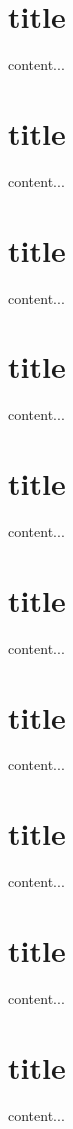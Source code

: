 \documentclass{beamer}
\begin{document}
\section{title}
\begin{frame}
content...
\end{frame}

\section{title}
\begin{frame}
content...
\end{frame}

\section{title}
\begin{frame}
content...
\end{frame}

\section{title}
\begin{frame}
content...
\end{frame}

\section{title}
\begin{frame}
content...
\end{frame}

\section{title}
\begin{frame}
content...
\end{frame}

\section{title}
\begin{frame}
content...
\end{frame}

\section{title}
\begin{frame}
content...
\end{frame}

\section{title}
\begin{frame}
content...
\end{frame}

\section{title}
\begin{frame}
content...
\end{frame}
\end{document}
